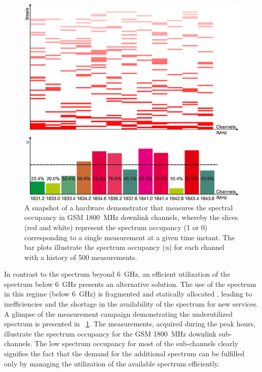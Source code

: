 \begin{figure}[!t]
\centering
\includegraphics[width = 0.9\columnwidth]{figures/Grafik_Poster}
\caption{A snapshot of a hardware demonstrator that measures the spectral occupancy in GSM \SI{1800}{MHz} downlink channels, whereby the slices (red and white) represent the spectrum occupancy (1 or 0) corresponding to a single measurement at a given time instant. The bar plots illustrate the spectrum occupancy (u) for each channel with a history of 500 measurements\protect{}.}
\label{fig_Int:HW_I}
\end{figure}


In contrast to the spectrum beyond \SI{6}{GHz}, an efficient utilization of the spectrum below \SI{6}{GHz} presents an alternative solution. The use of the spectrum in this regime (below \SI{6}{GHz}) is fragmented and statically allocated \cite{Mchen05, Mchen07}, leading to inefficiencies and the shortage in the availability of the spectrum for new services. A glimpse of the measurement campaign demonstrating the underutilized spectrum is presented in \figurename~\ref{fig_Int:HW_I}. The measurements, acquired during the peak hours, illustrate the spectrum occupancy for the GSM \SI{1800}{MHz} downlink sub-channels. The low spectrum occupancy for most of the sub-channels clearly signifies the fact that the demand for the additional spectrum can be fulfilled only by managing the utilization of the available spectrum efficiently. 

